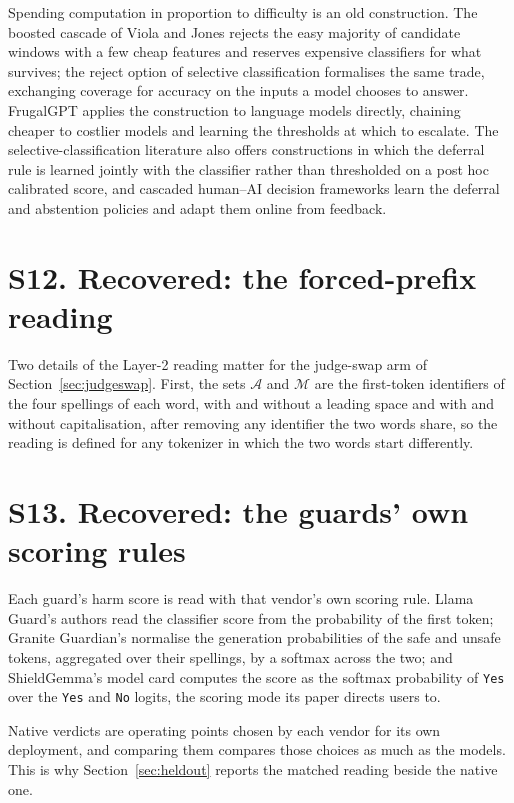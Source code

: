 \documentclass[journal]{IEEEtran}
\begin{document}
Spending computation in proportion to difficulty is an old construction. The
boosted cascade of Viola and Jones rejects the easy majority of candidate
windows with a few cheap features and reserves expensive classifiers for what
survives; the reject option of selective classification formalises the same
trade, exchanging coverage for accuracy on the inputs a model chooses to answer.
FrugalGPT applies the construction to language models directly, chaining cheaper
to costlier models and learning the thresholds at which to escalate. The
selective-classification literature also offers constructions in which the
deferral rule is learned jointly with the classifier rather than thresholded on
a post hoc calibrated score, and cascaded human--AI decision frameworks learn
the deferral and abstention policies and adapt them online from feedback.

\section*{S12. Recovered: the forced-prefix reading}

Two details of the Layer-2 reading matter for the judge-swap arm of
Section~\ref{sec:judgeswap}. First, the sets $\mathcal{A}$ and $\mathcal{M}$ are
the first-token identifiers of the four spellings of each word, with and without
a leading space and with and without capitalisation, after removing any
identifier the two words share, so the reading is defined for any tokenizer in
which the two words start differently.

\section*{S13. Recovered: the guards' own scoring rules}

Each guard's harm score is read with that vendor's own scoring rule. Llama
Guard's authors read the classifier score from the probability of the first
token; Granite Guardian's normalise the generation probabilities of the safe and
unsafe tokens, aggregated over their spellings, by a softmax across the two; and
ShieldGemma's model card computes the score as the softmax probability of
\texttt{Yes} over the \texttt{Yes} and \texttt{No} logits, the scoring mode its
paper directs users to.

Native verdicts are operating points chosen by each vendor for its own
deployment, and comparing them compares those choices as much as the models.
This is why Section~\ref{sec:heldout} reports the matched reading beside the
native one.
\FloatBarrier

\FloatBarrier

\end{document}
